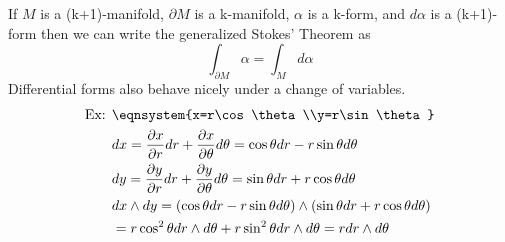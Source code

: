 If $M$ is a (k+1)-manifold, $\partial M$ is a k-manifold, $\alpha$ is a k-form, and $d\alpha$ is a (k+1)-form then we can write the generalized Stokes' Theorem as
$$\int_{\partial M}\alpha=\int_M d\alpha$$
Differential forms also behave nicely under a change of variables.
\begin{align*}
    \text{Ex: }&\eqnsystem{x=r\cos\theta\\y=r\sin\theta}\\
    &dx=\frac{\partial x}{\partial r}dr+\frac{\partial x}{\partial \theta}d\theta=\cos\theta dr-r\sin\theta d\theta\\
    &dy=\frac{\partial y}{\partial r}dr+\frac{\partial y}{\partial\theta}d\theta=\sin\theta dr+r\cos\theta d\theta\\
    &dx\wedge dy=(\cos\theta dr-r\sin\theta d\theta)\wedge(\sin\theta dr+r\cos\theta d\theta)\\
    &=r\cos^2\theta dr\wedge d\theta+r\sin^2\theta dr\wedge d\theta=rdr\wedge d\theta
\end{align*}